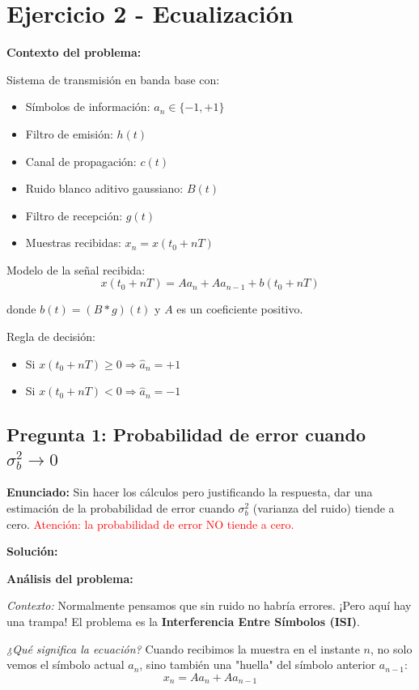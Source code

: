 \documentclass[11pt,a4paper]{article}
\begin{document}
\section*{Ejercicio 2 - Ecualización}

\textbf{Contexto del problema:}

Sistema de transmisión en banda base con:
\begin{itemize}
    \item Símbolos de información: $a_n \in \{-1, +1\}$
    \item Filtro de emisión: $h(t)$
    \item Canal de propagación: $c(t)$
    \item Ruido blanco aditivo gaussiano: $B(t)$
    \item Filtro de recepción: $g(t)$
    \item Muestras recibidas: $x_n = x(t_0 + nT)$
\end{itemize}

Modelo de la señal recibida:
\[
x(t_0 + nT) = A a_n + A a_{n-1} + b(t_0 + nT)
\]

donde $b(t) = (B * g)(t)$ y $A$ es un coeficiente positivo.

Regla de decisión:
\begin{itemize}
    \item Si $x(t_0 + nT) \geq 0 \Rightarrow \hat{a}_n = +1$
    \item Si $x(t_0 + nT) < 0 \Rightarrow \hat{a}_n = -1$
\end{itemize}

\subsection*{Pregunta 1: Probabilidad de error cuando $\sigma_b^2 \to 0$}

\textbf{Enunciado:} Sin hacer los cálculos pero justificando la respuesta, dar una estimación de la probabilidad de error cuando $\sigma_b^2$ (varianza del ruido) tiende a cero. \textcolor{red}{Atención: la probabilidad de error NO tiende a cero.}

\vspace{0.3cm}
\textbf{Solución:}

\textbf{Análisis del problema:}

\textit{Contexto:} Normalmente pensamos que sin ruido no habría errores. ¡Pero aquí hay una trampa! El problema es la \textbf{Interferencia Entre Símbolos (ISI)}.

\textit{¿Qué significa la ecuación?} Cuando recibimos la muestra en el instante $n$, no solo vemos el símbolo actual $a_n$, sino también una "huella" del símbolo anterior $a_{n-1}$:
\[
x_n = A a_n + A a_{n-1}
\]
\end{document}
